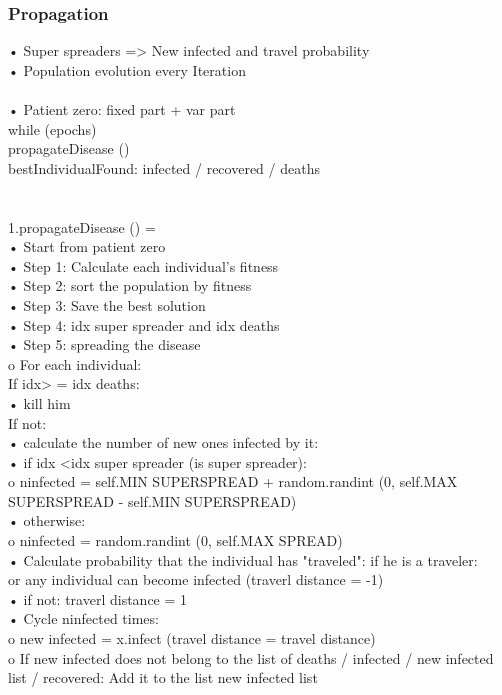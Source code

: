 \documentclass[letterpaper]{article}%
\begin{document}
\subsubsection{Propagation}
• Super spreaders => New infected and travel probability\\
• Population evolution every Iteration\\
\\
• Patient zero: fixed part + var part\\
while (epochs) {\\
propagateDisease ()\\
bestIndividualFound: infected / recovered / deaths\\
}\\
\\
1.propagateDisease () =\\
• Start from patient zero\\
• Step 1: Calculate each individual's fitness\\
• Step 2: sort the population by fitness\\
• Step 3: Save the best solution\\
• Step 4: idx super spreader and idx deaths\\
• Step 5: spreading the disease\\
o For each individual:\\
If idx> = idx deaths:\\
• kill him\\
If not:\\
• calculate the number of new ones infected by it:\\
• if idx <idx super spreader (is super spreader):\\
o ninfected = self.MIN SUPERSPREAD + random.randint (0, self.MAX SUPERSPREAD - self.MIN SUPERSPREAD)\\
• otherwise:\\
o ninfected = random.randint (0, self.MAX SPREAD)\\
• Calculate probability that the individual has "traveled": if he is a traveler:\\
or any individual can become infected (traverl distance = -1)\\
• if not: traverl distance = 1\\
• Cycle ninfected times:\\
o new infected = x.infect (travel distance = travel distance)\\
o If new infected does not belong to the list of deaths / infected / new infected list / recovered: Add it to the list new infected list\\
\end{document}
